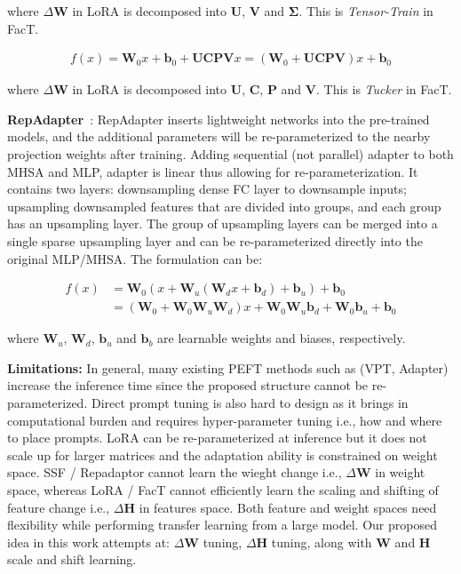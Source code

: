 where $\Delta \mathbf{W}$ in LoRA is decomposed into $\mathbf{U}$, $\mathbf{V}$ and $\bm \Sigma$. This is {\em Tensor-Train} in FacT.

\begin{equation}
\begin{array}{ll}  f(x)=\mathbf{W}_{0} x+\mathbf{b}_{0}+\mathbf{U} \mathbf{C} \mathbf{P} \mathbf{V} x=\left(\mathbf{W}_{0}+\mathbf{U} \mathbf{C} \mathbf{P} \mathbf{V}\right) x+\mathbf{b}_{0} 
\end{array}
\end{equation}

where $\Delta \mathbf{W}$ in LoRA is decomposed into $\mathbf{U}$, $\mathbf{C}$, $\mathbf{P}$ and $\mathbf{V}$. This is {\em Tucker }  in FacT.

{\bf RepAdapter}~\citep{luo2023towards}: RepAdapter inserts lightweight networks into the pre-trained models, and the additional parameters will be re-parameterized to the nearby projection weights after training. Adding sequential (not parallel) adapter to both MHSA and MLP, adapter is linear thus allowing for re-parameterization. It contains two layers: downsampling dense FC layer to downsample inputs; upsampling downsampled features that are divided into groups, and each group has an upsampling layer. The group of upsampling layers can be merged into a single sparse upsampling layer and can be re-parameterized directly into the original MLP/MHSA. The formulation can be:

\begin{equation}
\begin{array}{ll}  f(x)&=\mathbf{W}_{0}\left(x+\mathbf{W}_{u}\left(\mathbf{W}_{d} x+\mathbf{b}_{d}\right)+\mathbf{b}_{u}\right)+\mathbf{b}_{0}\\&=\left(\mathbf{W}_{0}+\mathbf{W}_{0} \mathbf{W}_{u} \mathbf{W}_{d}\right) x+\mathbf{W}_{0} \mathbf{W}_{u} \mathbf{b}_{d}+\mathbf{W}_{0} \mathbf{b}_{u}+\mathbf{b}_{0}\end{array}
\end{equation}

where $\mathbf{W}_u$, $\mathbf{W}_d$, $\mathbf{b}_u$ and $\mathbf{b}_b$ are learnable weights and biases, respectively.

{\bf Limitations:} In general, many existing PEFT methods such as (VPT, Adapter) increase the inference time since the proposed structure cannot be re-parameterized. Direct prompt tuning is also hard to design as it brings in computational burden and requires hyper-parameter tuning i.e., how and where to place prompts. LoRA can be re-parameterized at inference but it does not scale up for larger matrices and the adaptation ability is constrained on weight space. SSF / Repadaptor cannot learn the wieght change i.e., $\Delta \mathbf{W}$ in weight space, whereas LoRA / FacT cannot efficiently learn the scaling and shifting of feature change i.e., $\Delta \mathbf{H}$ in features space. Both feature and weight spaces need flexibility while performing transfer learning from a large model. Our proposed idea in this work attempts at: $\Delta \mathbf{W}$ tuning, $\Delta \mathbf{H}$ tuning, along with $\mathbf{W}$ and $\mathbf{H}$ scale and shift learning.

